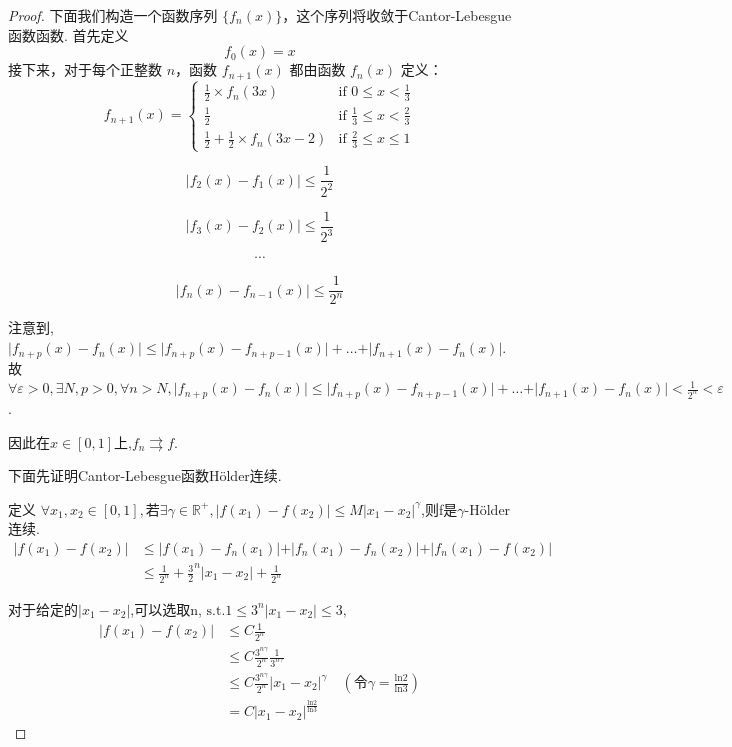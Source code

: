 \documentclass[hyperref,a4paper,UTF8]{ctexart}
\begin{document}
\begin{proof}
下面我们构造一个函数序列 $\{f_n(x)\}$，这个序列将收敛于Cantor-Lebesgue函数函数.
首先定义
\[
f_0(x) = x
\]
接下来，对于每个正整数 $n$，函数 $f_{n+1}(x)$ 都由函数 $f_n(x)$ 定义：
\[
f_{n+1}(x) = 
\begin{cases}
    \frac{1}{2} \times f_n(3x) & \text{if } 0 \leq x < \frac{1}{3} \\
    \frac{1}{2} & \text{if } \frac{1}{3} \leq x < \frac{2}{3} \\
    \frac{1}{2} + \frac{1}{2} \times f_n(3x-2) & \text{if } \frac{2}{3} \leq x \leq 1
\end{cases}
\]

\[
 \vert f_2(x) - f_1(x) \vert \le \frac{1}{2^2}
\]

\[
 \vert f_3(x) - f_2(x) \vert \le \frac{1}{2^3}
\]

\[
  \cdots
\]

\[
 \vert f_n(x) - f_{n-1}(x) \vert \le \frac{1}{2^n}
\]

注意到,$\vert f_{n+p}(x) - f_{n}(x) \vert \leqslant  \vert f_{n+p}(x) - f_{n+p-1}(x) \vert + \dots +\vert f_{n+1}(x) - f_{n}(x) \vert$. 
故$\forall \varepsilon > 0,\exists N,p > 0,\forall n > N,\vert f_{n+p}(x) - f_{n}(x) \vert \leqslant  \vert f_{n+p}(x) - f_{n+p-1}(x) \vert + \dots +\vert f_{n+1}(x) - f_{n}(x) \vert < \frac{1}{2^n} < \varepsilon$. 

因此在$x \in [0,1]$上,$f_n \rightrightarrows f$. 

下面先证明Cantor-Lebesgue函数Hölder连续. 

定义
$\forall x_1, x_2 \in [0,1] , \text{若}\exists \gamma \in \mathbb{R}^+,\vert f(x_1) - f(x_2) \vert \le M \vert x_1-x_2 \vert^\gamma$,则f是$\gamma$-Hölder连续.  
\begin{align*}
  \vert f(x_1) - f(x_2) \vert &\le \vert f(x_1) - f_n(x_1) \vert+\vert f_n(x_1) - f_n(x_2) \vert+\vert f_n(x_1) - f(x_2) \vert\\
  &\le \frac{1}{2^n}+\frac{3}{2}^n \vert x_1-x_2 \vert + \frac{1}{2^n}
\end{align*}

对于给定的$\vert x_1-x_2 \vert$,可以选取n, $\text{s.t.} 1 \leqslant 3^n\vert x_1-x_2 \vert \leqslant 3,$
\begin{align*}
\vert f(x_1) - f(x_2) \vert &\leqslant C \frac{1}{2^n} \\
&\leqslant C \frac{3^{n\gamma}}{2^n}\frac{1}{3^{n\gamma}}\\
&\leqslant C \frac{3^{n\gamma}}{2^n} \vert x_1-x_2 \vert^\gamma \quad (\text{令}\gamma = \frac{\mathrm{ln}2}{\mathrm{ln}3}) \\
& = C\vert x_1-x_2 \vert^{\frac{\mathrm{ln}2}{\mathrm{ln}3}}
\end{align*}


\end{proof}
\end{document}
